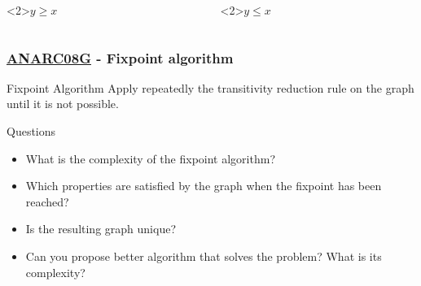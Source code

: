 \documentclass{beamer}
\newcommand{\ANAR}{\href{https://www.spoj.com/problems/ANARC08G/}{ANARC08G}}
\begin{document}
\begin{frame}[fragile]
  
\begin{columns}[t]
  \begin{column}{0.48\textwidth}
    \begin{block}<2>{$y \geq x$}
    \end{block}
  \end{column}
  \begin{column}{0.48\textwidth}
    \begin{block}<2>{$y \leq x$}
    \end{block}
  \end{column}

\end{columns}

\end{frame}


\begin{frame}[fragile]
  \frametitle{\ANAR{} - Fixpoint algorithm}

  \begin{alertblock}{Fixpoint Algorithm}
    Apply repeatedly the transitivity reduction rule on the graph until it is not possible. 
  \end{alertblock}


  \begin{exampleblock}{Questions}
    \begin{itemize}
    \item What is the complexity of the fixpoint algorithm?
    \item Which properties are satisfied by the graph when the fixpoint has been reached? 
    \item Is the resulting graph unique?
    \item Can you propose better algorithm that solves the problem? What is its complexity?
    \end{itemize}
  \end{exampleblock}

\end{frame}
\end{document}
